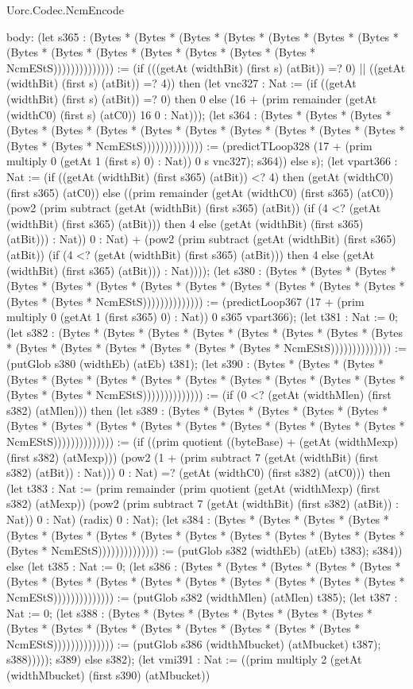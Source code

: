 \begin{lexlean}{Uorc.Codec.NcmEncode}
\begin{semanticmodule}
{  body: (let s365 : (Bytes * (Bytes * (Bytes * (Bytes * (Bytes * (Bytes * (Bytes * (Bytes * (Bytes * (Bytes * (Bytes * (Bytes * (Bytes * (Bytes * NcmEStS)))))))))))))) := (if (((getAt (widthBit) (first s) (atBit)) =? 0) || ((getAt (widthBit) (first s) (atBit)) =? 4)) then (let vnc327 : Nat := (if ((getAt (widthBit) (first s) (atBit)) =? 0) then 0 else (16 + (prim remainder (getAt (widthC0) (first s) (atC0)) 16 0 : Nat))); (let s364 : (Bytes * (Bytes * (Bytes * (Bytes * (Bytes * (Bytes * (Bytes * (Bytes * (Bytes * (Bytes * (Bytes * (Bytes * (Bytes * (Bytes * NcmEStS)))))))))))))) := (predictTLoop328 (17 + (prim multiply 0 (getAt 1 (first s) 0) : Nat)) 0 s vnc327); s364)) else s); (let vpart366 : Nat := (if ((getAt (widthBit) (first s365) (atBit)) <? 4) then (getAt (widthC0) (first s365) (atC0)) else ((prim remainder (getAt (widthC0) (first s365) (atC0)) (pow2 (prim subtract (getAt (widthBit) (first s365) (atBit)) (if (4 <? (getAt (widthBit) (first s365) (atBit))) then 4 else (getAt (widthBit) (first s365) (atBit))) : Nat)) 0 : Nat) + (pow2 (prim subtract (getAt (widthBit) (first s365) (atBit)) (if (4 <? (getAt (widthBit) (first s365) (atBit))) then 4 else (getAt (widthBit) (first s365) (atBit))) : Nat)))); (let s380 : (Bytes * (Bytes * (Bytes * (Bytes * (Bytes * (Bytes * (Bytes * (Bytes * (Bytes * (Bytes * (Bytes * (Bytes * (Bytes * (Bytes * NcmEStS)))))))))))))) := (predictLoop367 (17 + (prim multiply 0 (getAt 1 (first s365) 0) : Nat)) 0 s365 vpart366); (let t381 : Nat := 0; (let s382 : (Bytes * (Bytes * (Bytes * (Bytes * (Bytes * (Bytes * (Bytes * (Bytes * (Bytes * (Bytes * (Bytes * (Bytes * (Bytes * (Bytes * NcmEStS)))))))))))))) := (putGlob s380 (widthEb) (atEb) t381); (let s390 : (Bytes * (Bytes * (Bytes * (Bytes * (Bytes * (Bytes * (Bytes * (Bytes * (Bytes * (Bytes * (Bytes * (Bytes * (Bytes * (Bytes * NcmEStS)))))))))))))) := (if (0 <? (getAt (widthMlen) (first s382) (atMlen))) then (let s389 : (Bytes * (Bytes * (Bytes * (Bytes * (Bytes * (Bytes * (Bytes * (Bytes * (Bytes * (Bytes * (Bytes * (Bytes * (Bytes * (Bytes * NcmEStS)))))))))))))) := (if ((prim quotient ((byteBase) + (getAt (widthMexp) (first s382) (atMexp))) (pow2 (1 + (prim subtract 7 (getAt (widthBit) (first s382) (atBit)) : Nat))) 0 : Nat) =? (getAt (widthC0) (first s382) (atC0))) then (let t383 : Nat := (prim remainder (prim quotient (getAt (widthMexp) (first s382) (atMexp)) (pow2 (prim subtract 7 (getAt (widthBit) (first s382) (atBit)) : Nat)) 0 : Nat) (radix) 0 : Nat); (let s384 : (Bytes * (Bytes * (Bytes * (Bytes * (Bytes * (Bytes * (Bytes * (Bytes * (Bytes * (Bytes * (Bytes * (Bytes * (Bytes * (Bytes * NcmEStS)))))))))))))) := (putGlob s382 (widthEb) (atEb) t383); s384)) else (let t385 : Nat := 0; (let s386 : (Bytes * (Bytes * (Bytes * (Bytes * (Bytes * (Bytes * (Bytes * (Bytes * (Bytes * (Bytes * (Bytes * (Bytes * (Bytes * (Bytes * NcmEStS)))))))))))))) := (putGlob s382 (widthMlen) (atMlen) t385); (let t387 : Nat := 0; (let s388 : (Bytes * (Bytes * (Bytes * (Bytes * (Bytes * (Bytes * (Bytes * (Bytes * (Bytes * (Bytes * (Bytes * (Bytes * (Bytes * (Bytes * NcmEStS)))))))))))))) := (putGlob s386 (widthMbucket) (atMbucket) t387); s388))))); s389) else s382); (let vmi391 : Nat := ((prim multiply 2 (getAt (widthMbucket) (first s390) (atMbucket)) }
\end{semanticmodule}
\end{lexlean}
